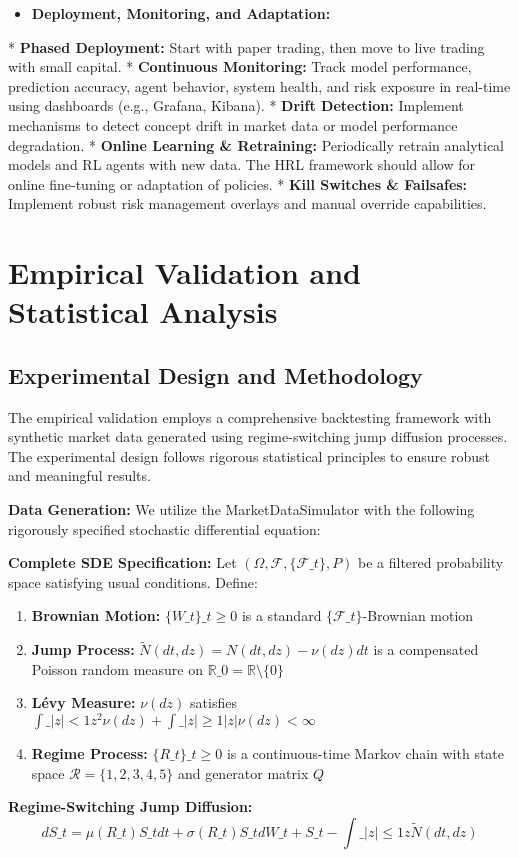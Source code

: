 \documentclass[11pt,a4paper]{article}
\begin{document}
\begin{itemize}
\item   \textbf{Deployment, Monitoring, and Adaptation:}
\end{itemize}
    *   \textbf{Phased Deployment:} Start with paper trading, then move to live trading with small capital.
    *   \textbf{Continuous Monitoring:} Track model performance, prediction accuracy, agent behavior, system health, and risk exposure in real-time using dashboards (e.g., Grafana, Kibana).
    *   \textbf{Drift Detection:} Implement mechanisms to detect concept drift in market data or model performance degradation.
    *   \textbf{Online Learning \& Retraining:} Periodically retrain analytical models and RL agents with new data. The HRL framework should allow for online fine-tuning or adaptation of policies.
    *   \textbf{Kill Switches \& Failsafes:} Implement robust risk management overlays and manual override capabilities.

\section{Empirical Validation and Statistical Analysis}

\subsection{Experimental Design and Methodology}

The empirical validation employs a comprehensive backtesting framework with synthetic market data generated using regime-switching jump diffusion processes. The experimental design follows rigorous statistical principles to ensure robust and meaningful results.

\textbf{Data Generation:} We utilize the MarketDataSimulator with the following rigorously specified stochastic differential equation:

\textbf{Complete SDE Specification:}
Let $(\Omega, \mathcal{F}, \{\mathcal{F}\_t\}, P)$ be a filtered probability space satisfying usual conditions. Define:

\begin{enumerate}
\item \textbf{Brownian Motion:} $\{W\_t\}\_{t \geq 0}$ is a standard $\{\mathcal{F}\_t\}$-Brownian motion
\item \textbf{Jump Process:} $\tilde{N}(dt, dz) = N(dt, dz) - \nu(dz)dt$ is a compensated Poisson random measure on $\mathbb{R}\_0 = \mathbb{R} \setminus \{0\}$
\item \textbf{Lévy Measure:} $\nu(dz)$ satisfies $\int\_{|z|<1} z^2 \nu(dz) + \int\_{|z| \geq 1} |z| \nu(dz) < \infty$
\item \textbf{Regime Process:} $\{R\_t\}\_{t \geq 0}$ is a continuous-time Markov chain with state space $\mathcal{R} = \{1,2,3,4,5\}$ and generator matrix $Q$

\end{enumerate}
\textbf{Regime-Switching Jump Diffusion:}
\begin{equation}
dS\_t = \mu(R\_t) S\_t dt + \sigma(R\_t) S\_t dW\_t + S\_{t-} \int\_{|z| \leq 1} z \tilde{N}(dt, dz)
\end{equation}
\end{document}
